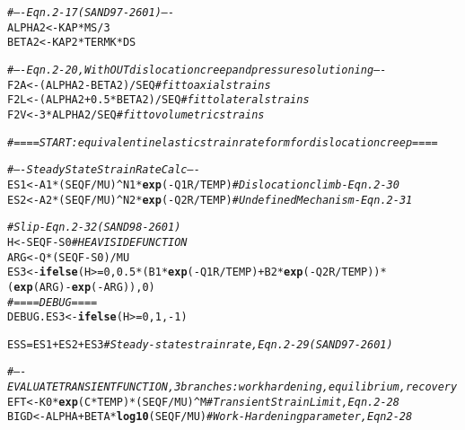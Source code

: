 \documentclass{article}\usepackage[]{graphicx}\usepackage[]{color}
\makeatletter
\newcommand{\hlnum}[1]{\textcolor[rgb]{0.686,0.059,0.569}{#1}}%
\newcommand{\hlcom}[1]{\textcolor[rgb]{0.678,0.584,0.686}{\textit{#1}}}%
\newcommand{\hlopt}[1]{\textcolor[rgb]{0,0,0}{#1}}%
\newcommand{\hlstd}[1]{\textcolor[rgb]{0.345,0.345,0.345}{#1}}%
\newcommand{\hlkwb}[1]{\textcolor[rgb]{0.69,0.353,0.396}{#1}}%
\newcommand{\hlkwd}[1]{\textcolor[rgb]{0.737,0.353,0.396}{\textbf{#1}}}%
\newenvironment{kframe}{%
 \def\at@end@of@kframe{}%
 \ifinner\ifhmode%
  \def\at@end@of@kframe{\end{minipage}}%
  \begin{minipage}{\columnwidth}%
 \fi\fi%
 \def\FrameCommand##1{\hskip\@totalleftmargin \hskip-\fboxsep
 \colorbox{shadecolor}{##1}\hskip-\fboxsep
     \hskip-\linewidth \hskip-\@totalleftmargin \hskip\columnwidth}%
 \MakeFramed {\advance\hsize-\width
   \@totalleftmargin\z@ \linewidth\hsize
   \@setminipage}}%
 {\par\unskip\endMakeFramed%
 \at@end@of@kframe}
\newenvironment{knitrout}{}{} %
\makeatother
\begin{document}
\begin{knitrout}
\begin{kframe}
\begin{alltt}
    \hlcom{# ---- Eqn. 2-17 (SAND97-2601) ----}
    \hlstd{ALPHA2}      \hlkwb{<-} \hlstd{KAP} \hlopt{*} \hlstd{MS} \hlopt{/} \hlnum{3}
    \hlstd{BETA2}       \hlkwb{<-} \hlstd{KAP2} \hlopt{*} \hlstd{TERMK} \hlopt{*} \hlstd{DS}

    \hlcom{# ---- Eqn. 2-20, WithOUT dislocation creep and pressure solutioning ----}
    \hlstd{F2A} \hlkwb{<-}      \hlstd{(ALPHA2} \hlopt{-} \hlstd{BETA2)}\hlopt{/}\hlstd{SEQ}        \hlcom{# fit to axial strains}
    \hlstd{F2L} \hlkwb{<-}      \hlstd{(ALPHA2} \hlopt{+} \hlnum{0.5} \hlopt{*} \hlstd{BETA2)}\hlopt{/}\hlstd{SEQ}  \hlcom{# fit to lateral strains}
    \hlstd{F2V} \hlkwb{<-}  \hlnum{3} \hlopt{*} \hlstd{ALPHA2} \hlopt{/} \hlstd{SEQ}            \hlcom{# fit to volumetric strains}

    \hlcom{# ==== START: equivalent inelastic strain rate form for dislocation creep ====}

    \hlcom{# ---- Steady State Strain Rate Calc ----}
    \hlstd{ES1} \hlkwb{<-} \hlstd{A1} \hlopt{*} \hlstd{(SEQF} \hlopt{/} \hlstd{MU)}\hlopt{^}\hlstd{N1} \hlopt{*} \hlkwd{exp}\hlstd{(}\hlopt{-}\hlstd{Q1R}\hlopt{/}\hlstd{TEMP)} \hlcom{# Dislocation climb - Eqn. 2-30}
    \hlstd{ES2} \hlkwb{<-} \hlstd{A2} \hlopt{*} \hlstd{(SEQF} \hlopt{/} \hlstd{MU)}\hlopt{^}\hlstd{N2} \hlopt{*} \hlkwd{exp}\hlstd{(}\hlopt{-}\hlstd{Q2R}\hlopt{/}\hlstd{TEMP)} \hlcom{# Undefined Mechanism - Eqn. 2-31}

    \hlcom{# Slip - Eqn. 2-32 (SAND98-2601)}
    \hlstd{H}   \hlkwb{<-} \hlstd{SEQF} \hlopt{-} \hlstd{S0} \hlcom{# HEAVISIDE FUNCTION}
    \hlstd{ARG} \hlkwb{<-} \hlstd{Q} \hlopt{*} \hlstd{(SEQF} \hlopt{-} \hlstd{S0)} \hlopt{/} \hlstd{MU}
    \hlstd{ES3} \hlkwb{<-} \hlkwd{ifelse}\hlstd{(H} \hlopt{>=} \hlnum{0}\hlstd{,} \hlnum{0.5} \hlopt{*} \hlstd{(B1} \hlopt{*} \hlkwd{exp}\hlstd{(}\hlopt{-}\hlstd{Q1R} \hlopt{/} \hlstd{TEMP)} \hlopt{+} \hlstd{B2} \hlopt{*} \hlkwd{exp}\hlstd{(}\hlopt{-}\hlstd{Q2R} \hlopt{/} \hlstd{TEMP))} \hlopt{*}
                    \hlstd{(}\hlkwd{exp}\hlstd{(ARG)} \hlopt{-} \hlkwd{exp}\hlstd{(}\hlopt{-}\hlstd{ARG)),}\hlnum{0}\hlstd{)}
    \hlcom{# ==== DEBUG ====}
    \hlstd{DEBUG.ES3} \hlkwb{<-} \hlkwd{ifelse}\hlstd{(H} \hlopt{>=}\hlnum{0}\hlstd{,} \hlnum{1}\hlstd{,} \hlopt{-}\hlnum{1}\hlstd{)}

    \hlstd{ESS} \hlkwb{=} \hlstd{ES1} \hlopt{+} \hlstd{ES2} \hlopt{+} \hlstd{ES3} \hlcom{# Steady-state strain rate, Eqn. 2-29 (SAND97-2601)}

    \hlcom{# ---- EVALUATE TRANSIENT FUNCTION, 3 branches: work hardening, equilibrium, recovery}
    \hlstd{EFT}  \hlkwb{<-} \hlstd{K0} \hlopt{*} \hlkwd{exp}\hlstd{(C} \hlopt{*} \hlstd{TEMP)} \hlopt{*} \hlstd{(SEQF} \hlopt{/} \hlstd{MU)} \hlopt{^} \hlstd{M}  \hlcom{# Transient Strain Limit, Eqn. 2-28}
    \hlstd{BIGD} \hlkwb{<-} \hlstd{ALPHA} \hlopt{+} \hlstd{BETA} \hlopt{*} \hlkwd{log10}\hlstd{(SEQF} \hlopt{/} \hlstd{MU)}       \hlcom{# Work-Hardening parameter, Eqn 2-28}


\end{alltt}
\end{kframe}
\end{knitrout}
\end{document}

